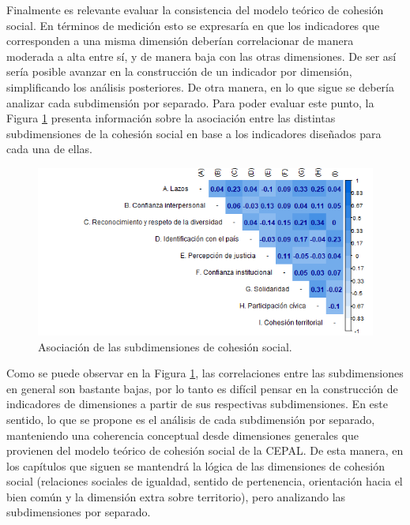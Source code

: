 \documentclass[
  12pt,
]{book}
\begin{document}
Finalmente es relevante evaluar la consistencia del modelo teórico de cohesión social. En términos de medición esto se expresaría en que los indicadores que corresponden a una misma dimensión deberían correlacionar de manera moderada a alta entre sí, y de manera baja con las otras dimensiones. De ser así sería posible avanzar en la construcción de un indicador por dimensión, simplificando los análisis posteriores. De otra manera, en lo que sigue se debería analizar cada subdimensión por separado. Para poder evaluar este punto, la Figura \ref{fig:cohesion-social-cor} presenta información sobre la asociación entre las distintas subdimensiones de la cohesión social en base a los indicadores diseñados para cada una de ellas.

\begin{figure}[H]

{\centering \includegraphics[width=1\linewidth,height=1\textheight]{output/graphs/cohesion_social_cor} 

}

\caption{Asociación de las subdimensiones de cohesión social.}\label{fig:cohesion-social-cor}
\end{figure}

Como se puede observar en la Figura \ref{fig:cohesion-social-cor}, las correlaciones entre las subdimensiones en general son bastante bajas, por lo tanto es difícil pensar en la construcción de indicadores de dimensiones a partir de sus respectivas subdimensiones. En este sentido, lo que se propone es el análisis de cada subdimensión por separado, manteniendo una coherencia conceptual desde dimensiones generales que provienen del modelo teórico de cohesión social de la CEPAL. De esta manera, en los capítulos que siguen se mantendrá la lógica de las dimensiones de cohesión social (relaciones sociales de igualdad, sentido de pertenencia, orientación hacia el bien común y la dimensión extra sobre territorio), pero analizando las subdimensiones por separado.
\end{document}

